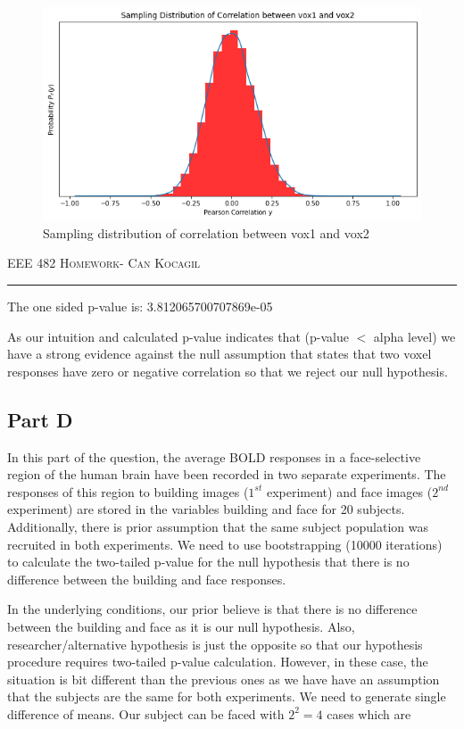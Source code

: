 \documentclass[12pt]{amsart}
\begin{document}
\begin{figure}[h]
    \centering
    \includegraphics[width = 1\textwidth]{images/9.png}
    \caption{Sampling distribution of correlation between vox1 and vox2}
\end{figure}


\newpage
{\scshape EEE 482} \hfill {\scshape \large  Homework-\relax} \hfill {\scshape Can Kocagil}
\smallskip
\hrule
\vspace{2mm}

The one sided p-value is: 3.812065700707869e-05

\bigskip

As our intuition and calculated p-value indicates that (p-value $<$ alpha level) we have a strong evidence against the null assumption that states that  two voxel responses have zero or negative correlation so that we reject our null hypothesis.

\subsection{Part D}
In this part of the question, the average BOLD responses in a face-selective region of the human brain have been
recorded in two separate experiments. The responses of this region to building images ($1^{st}$ experiment) and face images ($2^{nd}$ experiment) are stored in the variables building and face for 20 subjects. Additionally, there is prior assumption that the same subject population was recruited in both experiments. We need to use bootstrapping (10000 iterations) to calculate the two-tailed p-value for the null hypothesis that there is no difference between the building and face responses.

\bigskip
In the underlying conditions, our prior believe is that there is no difference between the building and face as it is our null hypothesis. Also, researcher/alternative hypothesis is just the opposite so that our hypothesis procedure requires two-tailed p-value calculation. However, in these case, the situation is bit different than the previous ones as we have have an assumption that the subjects are the same for both experiments. We need to generate single difference of means. Our subject can be faced with $2^2 = 4$ cases which are
\smallskip
\end{document}

